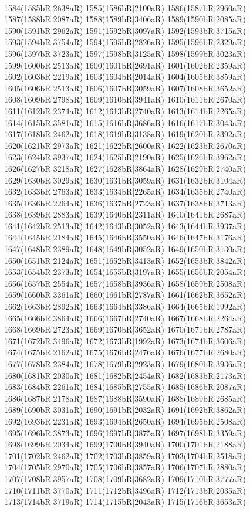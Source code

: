 \\1584(1585bR|2638aR) 1585(1586bR|2100aR) 1586(1587bR|2960aR) 1587(1588bR|2087aR) 1588(1589bR|3406aR) 1589(1590bR|2085aR) 1590(1591bR|2962aR) 1591(1592bR|3097aR) 1592(1593bR|3715aR) \\1593(1594bR|3754aR) 1594(1595bR|2826aR) 1595(1596bR|2329aR) 1596(1597bR|3723aR) 1597(1598bR|3125aR) 1598(1599bR|3023aR) 1599(1600bR|2513aR) 1600(1601bR|2691aR) 1601(1602bR|2359aR) \\1602(1603bR|2219aR) 1603(1604bR|2014aR) 1604(1605bR|3859aR) 1605(1606bR|2513aR) 1606(1607bR|3059aR) 1607(1608bR|3652aR) 1608(1609bR|2798aR) 1609(1610bR|3941aR) 1610(1611bR|2670aR) \\1611(1612bR|2374aR) 1612(1613bR|2740aR) 1613(1614bR|2265aR) 1614(1615bR|3581aR) 1615(1616bR|3686aR) 1616(1617bR|3043aR) 1617(1618bR|2462aR) 1618(1619bR|3138aR) 1619(1620bR|2392aR) \\1620(1621bR|2973aR) 1621(1622bR|2600aR) 1622(1623bR|2670aR) 1623(1624bR|3937aR) 1624(1625bR|2190aR) 1625(1626bR|3962aR) 1626(1627bR|3218aR) 1627(1628bR|3864aR) 1628(1629bR|2740aR) \\1629(1630bR|3029aR) 1630(1631bR|3059aR) 1631(1632bR|3104aR) 1632(1633bR|2763aR) 1633(1634bR|2265aR) 1634(1635bR|2740aR) 1635(1636bR|2264aR) 1636(1637bR|2723aR) 1637(1638bR|3713aR) \\1638(1639bR|2883aR) 1639(1640bR|2311aR) 1640(1641bR|2687aR) 1641(1642bR|2513aR) 1642(1643bR|3052aR) 1643(1644bR|3937aR) 1644(1645bR|2184aR) 1645(1646bR|3550aR) 1646(1647bR|3176aR) \\1647(1648bR|2389aR) 1648(1649bR|3052aR) 1649(1650bR|3130aR) 1650(1651bR|2124aR) 1651(1652bR|3413aR) 1652(1653bR|3842aR) 1653(1654bR|2373aR) 1654(1655bR|3197aR) 1655(1656bR|2054aR) \\1656(1657bR|2554aR) 1657(1658bR|3936aR) 1658(1659bR|2508aR) 1659(1660bR|3361aR) 1660(1661bR|2787aR) 1661(1662bR|3652aR) 1662(1663bR|2892aR) 1663(1664bR|3386aR) 1664(1665bR|1992aR) \\1665(1666bR|3864aR) 1666(1667bR|2740aR) 1667(1668bR|2264aR) 1668(1669bR|2723aR) 1669(1670bR|3652aR) 1670(1671bR|2787aR) 1671(1672bR|3496aR) 1672(1673bR|1992aR) 1673(1674bR|3606aR) \\1674(1675bR|2162aR) 1675(1676bR|2476aR) 1676(1677bR|2680aR) 1677(1678bR|2384aR) 1678(1679bR|2923aR) 1679(1680bR|3936aR) 1680(1681bR|2030aR) 1681(1682bR|2454aR) 1682(1683bR|2173aR) \\1683(1684bR|2261aR) 1684(1685bR|2755aR) 1685(1686bR|2087aR) 1686(1687bR|2178aR) 1687(1688bR|3590aR) 1688(1689bR|2685aR) 1689(1690bR|3031aR) 1690(1691bR|2032aR) 1691(1692bR|3862aR) \\1692(1693bR|2231aR) 1693(1694bR|2650aR) 1694(1695bR|2508aR) 1695(1696bR|3873aR) 1696(1697bR|3875aR) 1697(1698bR|3359aR) 1698(1699bR|2034aR) 1699(1700bR|3940aR) 1700(1701bR|2188aR) \\1701(1702bR|2462aR) 1702(1703bR|3859aR) 1703(1704bR|2518aR) 1704(1705bR|2970aR) 1705(1706bR|3857aR) 1706(1707bR|2880aR) 1707(1708bR|3957aR) 1708(1709bR|3682aR) 1709(1710bR|3777aR) \\1710(1711bR|3770aR) 1711(1712bR|3496aR) 1712(1713bR|2035aR) 1713(1714bR|3719aR) 1714(1715bR|2043aR) 1715(1716bR|3653aR) 